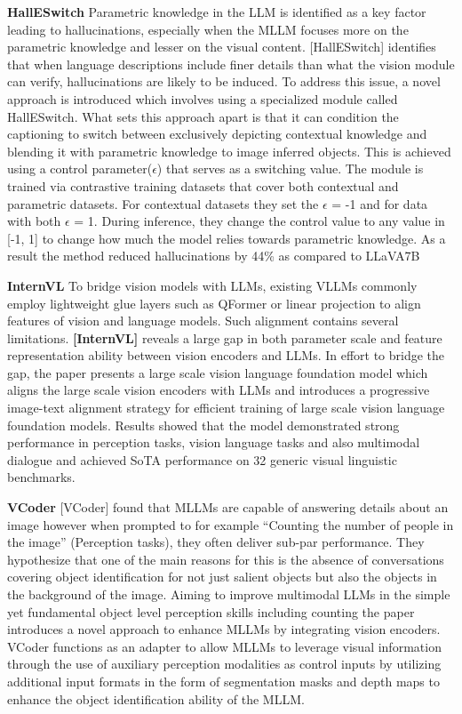 \documentclass[twocolumn, 9pt]{extarticle}
\begin{document}
\textbf{HallESwitch} 
Parametric knowledge in the LLM is identified as a key factor leading to hallucinations, especially when the MLLM focuses more on the parametric knowledge and lesser on the visual content.  [HallESwitch] identifies that when language descriptions include finer details than what the vision module can verify, hallucinations are likely to be induced. To address this issue, a novel approach is introduced which involves using a specialized module called HallESwitch. What sets this approach apart is that it can condition the captioning to switch between exclusively depicting contextual knowledge and blending it with parametric knowledge to image inferred objects. This is achieved using a control parameter($\epsilon$) that serves as a switching value. The module is trained via contrastive training datasets that cover both contextual and parametric datasets. For contextual datasets they set the $\epsilon$ = -1 and for data with both $\epsilon$ = 1. During inference, they change the control value to any value in [-1, 1] to change how much the model relies towards parametric knowledge. As a result the method reduced hallucinations by 44\% as compared to LLaVA7B



\textbf{InternVL} 
To bridge vision models with LLMs, existing VLLMs commonly employ lightweight glue layers such as QFormer or linear projection to align features of vision and language models. Such alignment contains several limitations. \textbf{[InternVL] }    reveals a large gap in both parameter scale and feature representation ability between vision encoders and LLMs. In effort to bridge the gap, the paper presents a large scale vision language foundation model which aligns the large scale vision encoders with LLMs and introduces a progressive image-text alignment strategy for efficient training of large scale vision language foundation models. Results showed that the model demonstrated strong performance in perception tasks, vision language tasks and also multimodal dialogue and achieved SoTA performance on 32 generic visual linguistic benchmarks. 
 

\textbf{VCoder} 
[VCoder] found that MLLMs are capable of answering details about an image however when prompted to for example “Counting the number of people in the image” (Perception tasks), they often deliver sub-par performance. They hypothesize that one of the main reasons for this is the absence of conversations covering object identification for not just salient objects but also the objects in the background of the image. Aiming to improve multimodal LLMs in the simple yet fundamental object level perception skills including counting the paper introduces a novel approach to enhance MLLMs by integrating vision encoders. VCoder functions as an adapter to allow MLLMs to leverage visual information through the use of auxiliary perception modalities as control inputs by utilizing additional input formats in the form of segmentation masks and depth maps to enhance the object identification ability of the MLLM. 
\end{document}
